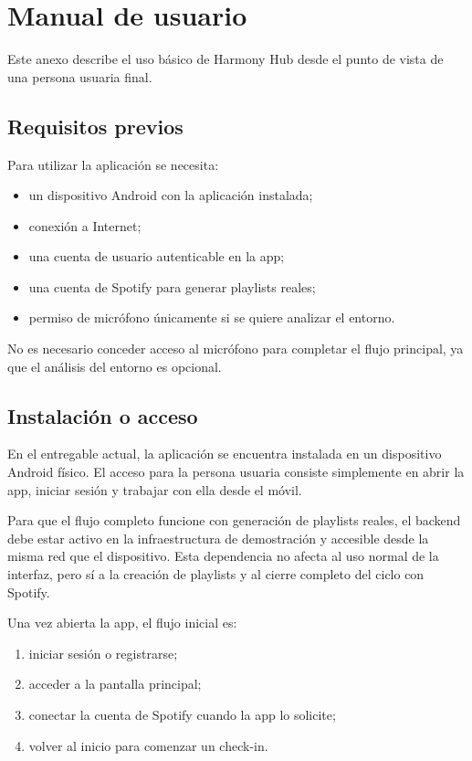 \chapter{Manual de usuario}
\label{anexo:manual_usuario}

Este anexo describe el uso básico de Harmony Hub desde el punto de vista de una
persona usuaria final.

\section{Requisitos previos}
\label{sec:manual_usuario_requisitos}

Para utilizar la aplicación se necesita:

\begin{itemize}
    \item un dispositivo Android con la aplicación instalada;
    \item conexión a Internet;
    \item una cuenta de usuario autenticable en la app;
    \item una cuenta de Spotify para generar playlists reales;
    \item permiso de micrófono únicamente si se quiere analizar el entorno.
\end{itemize}

No es necesario conceder acceso al micrófono para completar el flujo principal,
ya que el análisis del entorno es opcional.

\section{Instalación o acceso}
\label{sec:manual_usuario_instalacion}

En el entregable actual, la aplicación se encuentra instalada en un dispositivo
Android físico. El acceso para la persona usuaria consiste simplemente en abrir
la app, iniciar sesión y trabajar con ella desde el móvil.

Para que el flujo completo funcione con generación de playlists reales, el
backend debe estar activo en la infraestructura de demostración y accesible
desde la misma red que el dispositivo. Esta dependencia no afecta al uso normal
de la interfaz, pero sí a la creación de playlists y al cierre completo del
ciclo con Spotify.

Una vez abierta la app, el flujo inicial es:

\begin{enumerate}
    \item iniciar sesión o registrarse;
    \item acceder a la pantalla principal;
    \item conectar la cuenta de Spotify cuando la app lo solicite;
    \item volver al inicio para comenzar un check-in.
\end{enumerate}


